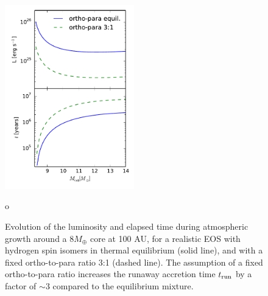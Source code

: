








\begin{figure}[H]
\centering
\includegraphics[width=0.5\textwidth]{figures/Ltplot_31.pdf}
\caption{Evolution of the luminosity and elapsed time during atmospheric growth around a $8 M_{\oplus}$ core at 100 AU, for a realistic EOS with hydrogen spin isomers in thermal equilibrium (solid line), and with a fixed ortho-to-para ratio 3:1 (dashed line). The assumption of a fixed ortho-to-para ratio increases the runaway accretion time $t_{\rm run}$ by a factor of $\sim$$3$ compared to the equilibrium mixture.}o
\label{fig:Lt_31}
\end{figure}


